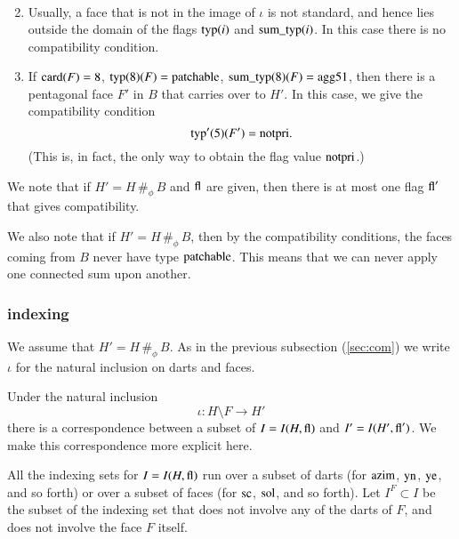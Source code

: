 \begin{definition}
\begin{enumerate}
$$\begin{array}{lll}
        \end{array}
        $$
    \item Usually, a face that is not in the image of $\iota$ is
    not standard, and hence lies outside the domain of the flags
    ${\operatorname{typ}}(i)$ and ${\operatorname{sum\_typ}}(i)$.  In this case there is
    no compatibility condition.
    \item If ${\operatorname{card}}(F)=8$, ${\operatorname{typ}}(8)(F)={\operatorname{patchable}}$,
    ${\operatorname{sum\_typ}}(8)(F) = {\operatorname{agg51}}$, then there is a
    pentagonal face $F'$ in $B$ that carries over to $H'$.  In this case, we
    give the compatibility condition
        $${\operatorname{typ}}'(5)(F') = {\operatorname{notpri}}.$$
    (This is, in fact, the only way to obtain the flag value
    ${\operatorname{notpri}}$.)
    \end{enumerate}
\end{definition}


\begin{remark}
We note that if $H'= H\,\#_\phi\, B$ and ${\operatorname{fl}}$ are given,
then there is at most one flag ${\operatorname{fl}}'$ that gives
compatibility.
\end{remark}

\begin{remark}
We also note that if $H' = H\,\#_\phi\, B$, then by the
compatibility conditions, the faces coming from $B$ never have
type ${\operatorname{patchable}}$. This means that we can never apply one
connected sum upon another.
\end{remark}

\subsubsection{indexing}

We assume that $H' = H\,\#_\phi\, B$.  As in the previous
subsection (\ref{sec:com}) we write $\iota$ for the natural
inclusion  on darts and faces.

Under the natural inclusion
    $$\iota:H\setminus F \to H'$$
there is a correspondence between a subset of $I=I(H,{\operatorname{fl}})$ and
$I'=I(H',{\operatorname{fl}}')$.  We make this correspondence more explicit
here.



All the indexing sets for $I=I(H,{\operatorname{fl}})$ run over a subset of
darts (for ${\operatorname{azim}}$, ${\operatorname{yn}}$, ${\operatorname{ye}}$, and so forth) or
over a subset of faces (for ${\operatorname{sc}}$, ${\operatorname{sol}}$, and so forth).
Let $I^F\subset I$ be the subset of the indexing set that does not
involve any of the darts of $F$, and does not involve the face $F$
itself.

